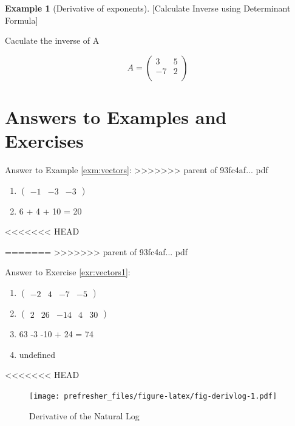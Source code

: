 \documentclass[]{book}
\providecommand{\tightlist}{%
  \setlength{\itemsep}{0pt}\setlength{\parskip}{0pt}}
\theoremstyle{definition}
\theoremstyle{definition}
\newtheorem{example}{Example}[chapter]
\theoremstyle{definition}
\theoremstyle{remark}
\begin{document}
\begin{example}[Derivative of exponents]
[Calculate Inverse using Determinant Formula]
\protect\hypertarget{exr:calcinverse}{}{\label{exr:calcinverse} {} }

Caculate the inverse of A

\[A = \begin{pmatrix}
            3 & 5\\
            -7 & 2\\
        \end{pmatrix}\]

\hypertarget{answers-to-examples-and-exercises-1}{%
\section*{Answers to Examples and Exercises}\label{answers-to-examples-and-exercises-1}}

Answer to Example \ref{exm:vectors}:
>>>>>>> parent of 93fc4af... pdf

\begin{enumerate}
\def\labelenumi{\arabic{enumi}.}
\tightlist
\item
  \(\begin{pmatrix} -1 &-3&-3 \end{pmatrix}\)
\item
  6 + 4 + 10 = 20
\end{enumerate}
<<<<<<< HEAD
\end{example}
=======
>>>>>>> parent of 93fc4af... pdf

Answer to Exercise \ref{exr:vectors1}:

\begin{enumerate}
\def\labelenumi{\arabic{enumi}.}
\tightlist
\item
  \(\begin{pmatrix} -2 &4&-7&-5 \end{pmatrix}\)
\item
  \(\begin{pmatrix} 2 &26&-14&4&30 \end{pmatrix}\)
\item
  63 -3 -10 + 24 = 74
\item
  undefined
\end{enumerate}

<<<<<<< HEAD
\begin{figure}
\centering
\texttt{[image: prefresher\_files/figure-latex/fig-derivlog-1.pdf]}
\caption{\label{fig:fig-derivlog}Derivative of the Natural Log}
\end{figure}
\end{document}
